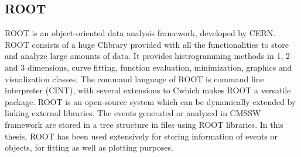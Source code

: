 \subsection{ROOT}
ROOT \cite{Brun:1997pa} is an object-oriented data analysis framework, developed by CERN. ROOT consists of a huge C\plusn\plus library provided with all the functionalities to store and analyze large amounts of data. It provides histrogramming methods in 1, 2 and 3 dimensions, curve fitting, function evaluation, minimization, graphics and visualization classes. The command language of ROOT is command line interpreter (CINT), with several extensions to C\plusn\plus which makes ROOT a versatile package. ROOT is an open-source system which can be dynamically extended by linking external libraries. The events generated or analyzed in CMSSW framework are stored in a tree structure in files using ROOT libraries. In this thesis, ROOT has been used extensively for storing information of events or objects, for fitting as well as plotting purposes.
